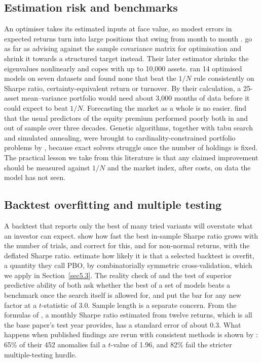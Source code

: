 \subsection{Estimation risk and benchmarks}

An optimiser takes its estimated inputs at face value, so modest errors in expected returns turn into large positions that swing from month to month \citep{michaud1989}. \citet{ledoit2004} go as far as advising against the sample covariance matrix for optimisation and shrink it towards a structured target instead. Their later estimator \citep{ledoit2020} shrinks the eigenvalues nonlinearly and copes with up to 10,000 assets. \citet{demiguel2009} ran 14 optimised models on seven datasets and found none that beat the $1/N$ rule consistently on Sharpe ratio, certainty-equivalent return or turnover. By their calculation, a 25-asset mean--variance portfolio would need about 3,000 months of data before it could expect to beat $1/N$. Forecasting the market as a whole is no easier. \citet{welch2008} find that the usual predictors of the equity premium performed poorly both in and out of sample over three decades. Genetic algorithms, together with tabu search and simulated annealing, were brought to cardinality-constrained portfolio problems by \citet{chang2000}, because exact solvers struggle once the number of holdings is fixed. The practical lesson we take from this literature is that any claimed improvement should be measured against $1/N$ and the market index, after costs, on data the model has not seen.

\subsection{Backtest overfitting and multiple testing}

A backtest that reports only the best of many tried variants will overstate what an investor can expect. \citet{bailey2014pseudo} show how fast the best in-sample Sharpe ratio grows with the number of trials, and \citet{bailey2014deflated} correct for this, and for non-normal returns, with the deflated Sharpe ratio. \citet{bailey2017pbo} estimate how likely it is that a selected backtest is overfit, a quantity they call PBO, by combinatorially symmetric cross-validation, which we apply in Section~\ref{sec5.3}. The reality check of \citet{white2000} and the test of superior predictive ability of \citet{hansen2005} both ask whether the best of a set of models beats a benchmark once the search itself is allowed for, and \citet{harvey2016} put the bar for any new factor at a $t$-statistic of 3.0. Sample length is a separate concern. From the formulas of \citet{lo2002}, a monthly Sharpe ratio estimated from twelve returns, which is all the base paper's test year provides, has a standard error of about 0.3. What happens when published findings are rerun with consistent methods is shown by \citet{hou2020}: 65\% of their 452 anomalies fail a $t$-value of 1.96, and 82\% fail the stricter multiple-testing hurdle.

